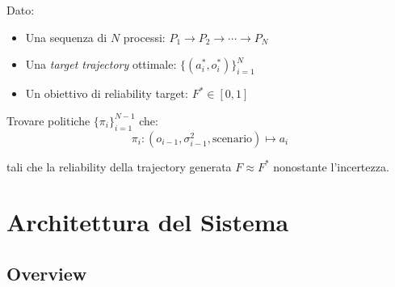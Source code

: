 \documentclass[11pt,a4paper]{article}
\begin{document}
Dato:
\begin{itemize}
    \item Una sequenza di $N$ processi: $P_1 \to P_2 \to \cdots \to P_N$
    \item Una \textit{target trajectory} ottimale: $\{(a_i^*, o_i^*)\}_{i=1}^N$
    \item Un obiettivo di reliability target: $F^* \in [0,1]$
\end{itemize}

Trovare politiche $\{\pi_i\}_{i=1}^{N-1}$ che:
\begin{equation}
\pi_i: (o_{i-1}, \sigma_{i-1}^2, \text{scenario}) \mapsto a_i
\end{equation}

tali che la reliability della trajectory generata $F \approx F^*$ nonostante l'incertezza.

\section{Architettura del Sistema}

\subsection{Overview}
\end{document}
